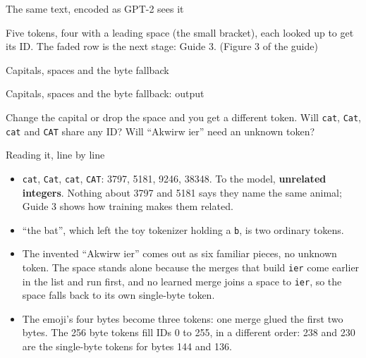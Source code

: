 \documentclass[aspectratio=169,11pt,t,\primeropts]{beamer}
\newcommand\tok[1]{\texttt{#1}}
\newcommand\vsp{\textvisiblespace}%
\begin{document}
\begin{frame}{The same text, encoded as GPT-2 sees it}
  \vspace{-2mm}
  \vspace{-2mm}
  \begin{center}\footnotesize
    Five tokens, four with a leading space (the small bracket), each looked up to get its ID. The
    faded row is the next stage: Guide 3. {\color{primerMuted}(Figure 3 of the guide)}
  \end{center}
\end{frame}

\begin{frame}{Capitals, spaces and the byte fallback}
\end{frame}

\begin{frame}{Capitals, spaces and the byte fallback: output}
  \begin{keyidea}
    Change the capital or drop the space and you get a different token. Will \tok{\vsp cat},
    \tok{\vsp Cat}, \tok{cat} and \tok{\vsp CAT} share any ID? Will ``Akwirw ier'' need an
    unknown token?
  \end{keyidea}
  \renewcommand\codesize{\footnotesize}
\end{frame}

\begin{frame}{Reading it, line by line}
  \small
  \begin{itemize}
    \item \tok{\vsp cat}, \tok{\vsp Cat}, \tok{cat}, \tok{\vsp CAT}: 3797, 5181, 9246, 38348. To the
      model, \textbf{unrelated integers}. Nothing about 3797 and 5181 says they name the same
      animal; Guide 3 shows how training makes them related.
    \item<2-> ``the bat'', which left the toy tokenizer holding a \tok{b}, is two ordinary tokens.
    \item<3-> The invented ``Akwirw ier'' comes out as six familiar pieces, no unknown token. The
      space stands alone because the merges that build \tok{ier} come earlier in the list and run
      first, and no learned merge joins a space to \tok{ier}, so the space falls back to its own
      single-byte token.
    \item<4-> The emoji's four bytes become three tokens: one merge glued the first two bytes. The
      256 byte tokens fill IDs 0 to 255, in a different order: 238 and 230 are the single-byte
      tokens for bytes 144 and 136.
  \end{itemize}
\end{frame}
\end{document}
